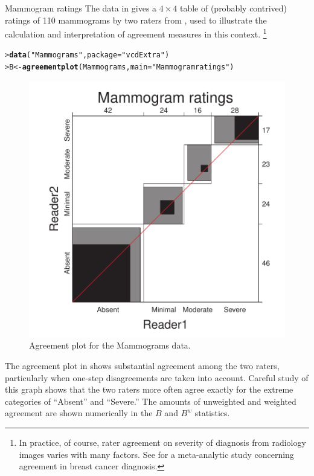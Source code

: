 \documentclass[10pt,krantz2]{krantz}\usepackage[]{graphicx}\usepackage[]{color}
\makeatletter
\newcommand{\hlstr}[1]{\textcolor[rgb]{0.192,0.494,0.8}{#1}}%
\newcommand{\hlstd}[1]{\textcolor[rgb]{0.345,0.345,0.345}{#1}}%
\newcommand{\hlkwb}[1]{\textcolor[rgb]{0.69,0.353,0.396}{#1}}%
\newcommand{\hlkwc}[1]{\textcolor[rgb]{0.333,0.667,0.333}{#1}}%
\newcommand{\hlkwd}[1]{\textcolor[rgb]{0.737,0.353,0.396}{\textbf{#1}}}%
\newenvironment{kframe}{%
 \def\at@end@of@kframe{}%
 \ifinner\ifhmode%
  \def\at@end@of@kframe{\end{minipage}}%
  \begin{minipage}{\columnwidth}%
 \fi\fi%
 \def\FrameCommand##1{\hskip\@totalleftmargin \hskip-\fboxsep
 \colorbox{shadecolor}{##1}\hskip-\fboxsep
     \hskip-\linewidth \hskip-\@totalleftmargin \hskip\columnwidth}%
 \MakeFramed {\advance\hsize-\width
   \@totalleftmargin\z@ \linewidth\hsize
   \@setminipage}}%
 {\par\unskip\endMakeFramed%
 \at@end@of@kframe}
\newenvironment{knitrout}{}{} %
\renewenvironment{knitrout}{\small\renewcommand{\baselinestretch}{.85}}{} %
\makeatother
\begin{document}
\begin{Example}[mammograms]{Mammogram ratings}
The  data in  gives a $4 \times 4$ table
of (probably contrived) ratings of 110 mammograms by two raters from
\citet{KundelPolansky:2003}, used to illustrate the calculation
and interpretation of agreement measures in this context.%
\footnote{
In practice, of course, rater agreement on severity of diagnosis from
radiology images varies with many factors.  See \citet{AntonioCrespi:2010}
for a meta-analytic study concerning agreement in breast cancer diagnosis.
}

\begin{knitrout}
\color{fgcolor}\begin{kframe}
\begin{alltt}
\hlstd{> }\hlkwd{data}\hlstd{(}\hlstr{"Mammograms"}\hlstd{,} \hlkwc{package} \hlstd{=} \hlstr{"vcdExtra"}\hlstd{)}
\hlstd{> }\hlstd{B} \hlkwb{<-} \hlkwd{agreementplot}\hlstd{(Mammograms,} \hlkwc{main} \hlstd{=} \hlstr{"Mammogram ratings"}\hlstd{)}
\end{alltt}
\end{kframe}\begin{figure}[!htbp]

\centerline{\includegraphics[width=.6\textwidth]{ch04/fig/mammograms1-1} }

\caption[Agreement plot for the Mammograms data]{Agreement plot for the Mammograms data.}\label{fig:mammograms1}
\end{figure}


\end{knitrout}
The agreement plot in  shows substantial agreement
among the two raters, particularly when one-step disagreements are taken into
account.  Careful study of this graph shows that the two raters more often
agree exactly for the extreme categories of ``Absent'' and ``Severe.''
The amounts of unweighted and weighted
agreement are shown numerically in the $B$ and $B^w$
statistics.


\end{Example}
\end{document}
